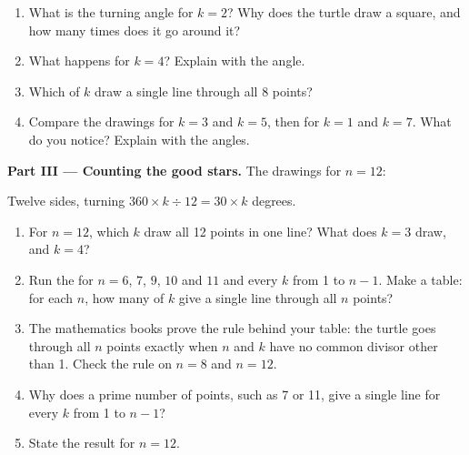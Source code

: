 \begin{problem}
\begin{enumerate}[resume]
  \item What is the turning angle for $k = 2$? Why does the turtle draw a square,
    and how many times does it go around it?
  \item What happens for $k = 4$? Explain with the angle.
  \item Which  of $k$ draw a single line through all 8 points?
  \item Compare the drawings for $k = 3$ and $k = 5$, then for $k = 1$ and
    $k = 7$. What do you notice? Explain with the angles.
\end{enumerate}

\medskip\noindent\textbf{Part III --- Counting the good stars.} The drawings for
$n = 12$:

\begin{omfigure}

{\small Twelve sides, turning $360 \times k \div 12 = 30 \times k$ degrees.}
\end{omfigure}

\begin{enumerate}[resume]
  \item For $n = 12$, which $k$ draw all 12 points in one line? What does
    $k = 3$ draw, and $k = 4$?
  \item Run the  for $n = 6$, $7$, $9$, $10$ and $11$ and every $k$
    from 1 to $n - 1$. Make a table: for each $n$, how many  of $k$ give
    a single line through all $n$ points?
  \item The mathematics books prove the rule behind your table: the turtle goes
    through all $n$ points exactly when $n$ and $k$ have no common divisor
    other than 1. Check the rule on $n = 8$ and $n = 12$.
  \item Why does a prime number of points, such as 7 or 11, give a single line
    for every $k$ from 1 to $n - 1$?
  \item State the result for $n = 12$.
\end{enumerate}
\end{problem}
